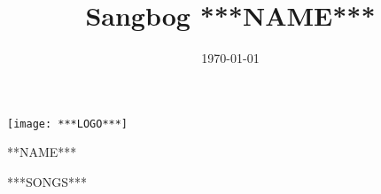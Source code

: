 \documentclass[pdftex, twoside]{article}
\title{Sangbog ***NAME*** \the\year}
\date{\today}
\begin{document}

\thispagestyle{empty}
\centering
\phantom{test}
\vspace{1cm}
\mbox{\texttt{[image: ***LOGO***]}}
\vspace{1cm}
\begin{center}
\selectfont\Huge ***NAME*** \the\year
\end{center}
\vspace{2.5cm}
\newpage
\setcounter{page}{0}
\raggedright
{}

\begin{songs}{}

***SONGS***

\end{songs}
\end{document}
